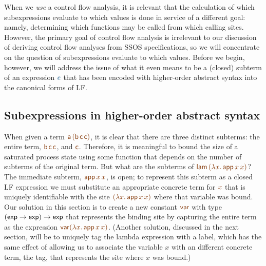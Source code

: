 When we {\it use} a control flow analysis, it is relevant that the
calculation of which subexpressions evaluate to which values is done
in service of a different goal: namely, determining which functions
may be called from which calling sites. However, the primary goal of
control flow analysis is irrelevant to our discussion of deriving
control flow analyses from SSOS specifications, so we will concentrate
on the question of subexpressions evaluate to which values. Before we
begin, however, we will address the issue of what it even means to be
a (closed) subterm of an expression $\obj{e}$ that has been encoded
with higher-order abstract syntax into the canonical forms of LF.

\subsection{Subexpressions in higher-order abstract syntax}
\label{sec:hoas-subexpressions}

When given a term $\lf{{\sf a}\,({\sf b}\,{\sf c}\,{\sf c})}$, it is
clear that there are three distinct subterms: the entire term,
$\lf{{\sf b}\,{\sf c}\,{\sf c}}$, and $\lf{{\sf c}}$. Therefore, it is
meaningful to bound the size of a saturated process state using some
function that depends on the number of subterms of the original
term. But what are the subterms of $\lf{{\sf lam}\,(\lambda x.\,{\sf
    app}\,x\,x)}$? The immediate subterm, $\lf{{\sf app}\,x\,x}$, is
open; to represent this subterm as a closed LF expression we must
substitute an appropriate concrete term for $\lf{x}$ that is uniquely
identifiable with the site $\lf{(\lambda x.\,{\sf app}\,x\,x)}$ where
that variable was bound.  Our solution in this section is to create a
new constant $\lf{\sf var}$ with type $({\sf exp} \rightarrow {\sf
  exp}) \rightarrow {\sf exp}$ that represents the binding site by
capturing the entire term as the expression $\lf{{\sf var}(\lambda
  x.\,{\sf app}\,x\,x)}$. (Another solution, discussed in the next
section, will be to uniquely tag the lambda expression with a label,
which has the same effect of allowing us to associate the variable $x$
with an different concrete term, the tag, that represents the site
where $x$ was bound.)

